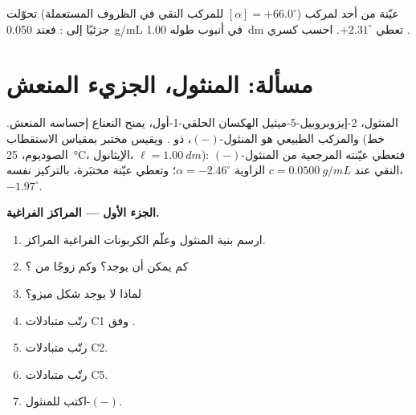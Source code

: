 \begin{exercise}[$\star\star\star$]\label{exo:b1:stereochemistry-in-depth:12}
عيّنة من أحد  لمركب ($[\alpha] = +66.0^\circ$ للمركب
النقي في الظروف المستعملة) تحوّلت جزئيًا إلى : فعند
\qty{0.050}{g/mL} في أنبوب طوله \qty{1.00}{dm} تعطي $+2.31^\circ$.
احسب كسري .
\end{exercise}

\section{مسألة: المنثول، الجزيء المنعش}

\begin{problem}
\label{pb:b1:stereochemistry-in-depth:1}
المنثول، 2-إيزوبروبيل-5-ميثيل الهكسان الحلقي-1-أول، يمنح النعناع إحساسه
المنعش. والمركب الطبيعي هو المنثول-$(-)$، ذو 
. ويقيس مختبر بمقياس الاستقطاب (خط الصوديوم،
\qty{25}{\celsius}، الإيثانول، $\ell = \qty{1.00}{dm}$): فتعطي عيّنته المرجعية
من المنثول-$(-)$ النقي عند $c = \qty{0.0500}{g/mL}$ الزاوية $\alpha =
-2.46^\circ$؛ وتعطي عيّنة مختبَرة، بالتركيز نفسه،
$-1.97^\circ$.

\medskip
\noindent\textbf{الجزء الأول --- المراكز الفراغية.}
\begin{enumerate}
  \item ارسم بنية المنثول وعلّم الكربونات الفراغية المراكز.
  \item كم  يمكن أن يوجد؟ وكم زوجًا من
        ؟
  \item لماذا لا يوجد شكل ميزو؟
  \item رتّب متبادلات C1 وفق .
  \item رتّب متبادلات C2.
  \item رتّب متبادلات C5.
  \item اكتب   للمنثول-$(-)$.
\end{enumerate}


\end{problem}
